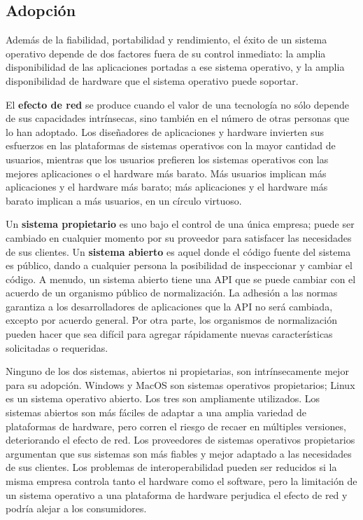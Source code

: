 \documentclass[10pt]{book}
\begin{document}
\subsection{Adopción}
Además de la fiabilidad, portabilidad y rendimiento, el éxito de un sistema operativo depende de dos factores fuera de su control inmediato: la amplia disponibilidad de las aplicaciones portadas a ese sistema operativo, y la amplia disponibilidad de hardware que el sistema operativo puede soportar.

El \textbf{efecto de red} se produce cuando el valor de una tecnología no sólo depende de sus capacidades intrínsecas, sino también en el número de otras personas que lo han adoptado. Los diseñadores de aplicaciones y hardware invierten sus esfuerzos en las plataformas de sistemas operativos con la mayor cantidad de usuarios, mientras que los usuarios prefieren los sistemas operativos con las mejores aplicaciones o el hardware más barato. Más usuarios implican más aplicaciones y el hardware más barato; más aplicaciones y el hardware más barato implican a más usuarios, en un círculo virtuoso.

Un \textbf{sistema propietario} es uno bajo el control de una única empresa; puede ser cambiado en cualquier momento por su proveedor para satisfacer las necesidades de sus clientes. Un \textbf{sistema abierto} es aquel donde el código fuente del sistema es público, dando a cualquier persona la posibilidad de inspeccionar y cambiar el código. A menudo, un sistema abierto tiene una API que se puede cambiar con el acuerdo de un organismo público de normalización. La adhesión a las normas garantiza a los desarrolladores de aplicaciones que la API no será cambiada, excepto por acuerdo general. Por otra parte, los organismos de normalización pueden hacer que sea difícil para agregar rápidamente nuevas características solicitadas o requeridas. 

Ninguno de los dos sistemas, abiertos ni propietarias, son intrínsecamente mejor para su adopción. Windows y MacOS son sistemas operativos propietarios; Linux es un sistema operativo abierto. Los tres son ampliamente utilizados. Los sistemas abiertos son más fáciles de adaptar a una amplia variedad de plataformas de hardware, pero corren el riesgo de recaer en múltiples versiones, deteriorando el efecto de red. Los proveedores de sistemas operativos propietarios argumentan que sus sistemas son más fiables y mejor adaptado a las necesidades de sus clientes. Los problemas de interoperabilidad pueden ser reducidos si la misma empresa controla tanto el hardware como el software, pero la limitación de un sistema operativo a una plataforma de hardware perjudica el efecto de red y podría alejar a los consumidores.
\end{document}
